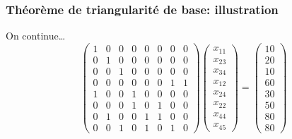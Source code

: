 \documentclass[usepdftitle=false]{beamer}
\begin{document}
\begin{frame}
\frametitle{Théorème de triangularité de base: illustration}

On continue\ldots
\[
\begin{pmatrix}
 1 & 0 & 0 & 0 & 0 & 0 & 0 & 0 \\
 0 & 1 & 0 & 0 & 0 & 0 & 0 & 0 \\
 0 & 0 & 1 & 0 & 0 & 0 & 0 & 0 \\
 0 & 0 & 0 & 0 & 0 & 0 & 1 & 1 \\
 1 & 0 & 0 & 1 & 0 & 0 & 0 & 0 \\
 0 & 0 & 0 & 1 & 0 & 1 & 0 & 0 \\
 0 & 1 & 0 & 0 & 1 & 1 & 0 & 0 \\
 0 & 0 & 1 & 0 & 1 & 0 & 1 & 0
\end{pmatrix}
\begin{pmatrix}
x_{11} \\
x_{23} \\
x_{34} \\
x_{12} \\
x_{24} \\
x_{22} \\
x_{44} \\
x_{45}
\end{pmatrix}
=
\begin{pmatrix}
10 \\
20 \\
10 \\
60 \\
30 \\
50 \\
80 \\
80
\end{pmatrix}
\]

\end{frame}
\end{document}
